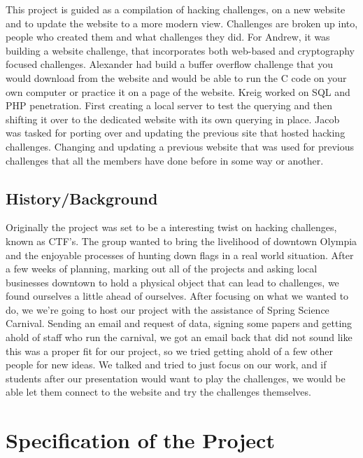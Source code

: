 \documentclass[runningheads,a4paper]{llncs}
\begin{document}
This project is guided as a compilation of hacking challenges, on a new website and to update the website to a more modern view. Challenges are broken up into, people who created them and what challenges they did. For Andrew, it was building a website challenge, that incorporates both web-based and cryptography focused challenges. Alexander had build a buffer overflow challenge that you would download from the website and would be able to run the C code on your own computer or practice it on a page of the website. Kreig worked on SQL and PHP penetration. First creating a local server to test the querying and then shifting it over to the dedicated website with its own querying in place. Jacob was tasked for porting over and updating the previous site that hosted hacking challenges. Changing and updating a previous website that was used for previous challenges that all the members have done before in some way or another.

\subsection{History/Background}

Originally the project was set to be a interesting twist on hacking challenges, known as CTF’s. The group wanted to bring the livelihood of downtown Olympia and the enjoyable processes of hunting down flags in a real world situation. After a few weeks of planning, marking out all of the projects and asking local businesses downtown to hold a physical object that can lead to challenges, we found ourselves a little ahead of ourselves. After focusing on what we wanted to do, we we’re going to host our project with the assistance of Spring Science Carnival.  Sending an email and request of data, signing some papers and getting ahold of staff who run the carnival, we got an email back that did not sound like this was a proper fit for our project, so we tried getting ahold of a few other people for new ideas. We talked and tried to just focus on our work, and if students after our presentation would want to play the challenges, we would be able let them connect to the website and try the challenges themselves.

\section{Specification of the Project}
\end{document}
